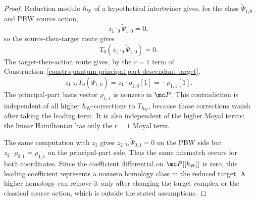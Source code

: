\begin{proof}
	  Reduction modulo \(\hbar_{\mathrm{W}}\) of a hypothetical intertwiner gives, for
  the class \(\widetilde\Psi_{1,0}\) and PBW source action,
  \[
    z_1\cdot_0\widetilde\Psi_{1,0}=0,
  \]
  so the source-then-target route gives
  \[
    T_0(z_1\cdot_0\widetilde\Psi_{1,0})=0.
  \]
  The target-then-action route gives, by the \(r=1\) term of
  Construction~\ref{constr:quantum-principal-part-descendant-target},
  \[
    z_1\cdot_0T_0(\widetilde\Psi_{1,0})
      =z_1\cdot\rho_{1,0}[1]
      =-\rho_{1,1}[1].
  \]
  The principal-part basis vector \(\rho_{1,1}\) is nonzero in
  \(\mc P\).  This contradiction is independent of all higher
	  \(\hbar_{\mathrm{W}}\)-corrections to \(T_{\hbar_{\mathrm{W}}}\), because those corrections vanish
  after taking the leading term.  It is also independent of the higher
	  Moyal terms: the linear Hamiltonian has only the \(r=1\) Moyal
	  term.

  The same computation with \(z_2\) gives
  \(z_2\cdot_0\widetilde\Psi_{0,1}=0\) on the PBW side but
  \(z_2\cdot\rho_{0,1}=\rho_{1,1}\) on the principal-part side.  Thus
	  the same mismatch occurs for both coordinates.
	  Since the coefficient differential on \(\mc P[[\hbar_{\mathrm{W}}]]\) is zero,
	  this leading coefficient represents a nonzero homology class in the
	  reduced target.
  A higher homotopy can remove it only after changing the target
  complex or the classical source action, which is outside the stated
  assumptions.
\end{proof}

